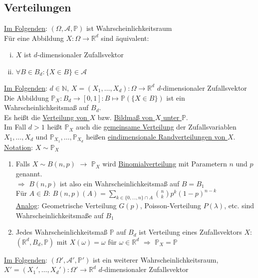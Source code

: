 \documentclass[a4paper]{article}
\newcommand{\ul}{\underline}
\begin{document}
\subsection{Verteilungen}
\ul{Im Folgenden}: $(\Omega,\mathcal{A},\mathbb{P})$ ist Wahrscheinlichkeitsraum\\
Für eine Abbildung $X:\Omega\rightarrow\mathbb{R}^d$ sind äquivalent:
\begin{enumerate}[(i)]
	\item $X$ ist $d$-dimensionaler Zufallsvektor
	\item $\forall B\in B_d:\{X\in B\}\in \mathcal{A}$
\end{enumerate}
\ul{Im Folgenden}: $d\in\mathbb{N}$, $X=(X_1,\dots,X_d):\Omega\rightarrow\mathbb{R}^d$ $d$-dimensionaler Zufallsvektor\\
Die Abbildung $\mathbb{P}_X:B_d\rightarrow\left[0,1\right]:B\mapsto\mathbb{P}(\{X\in B\})$ ist ein Wahrscheinlichkeitsmaß auf $B_d$.\\
Es heißt die \ul{Verteilung von $X$} bzw. \ul{Bildmaß von $X$ unter $\mathbb{P}$}.\\
Im Fall $d>1$ heißt $\mathbb{P}_X$ auch die \ul{gemeinsame Verteilung} der Zufallsvariablen $X_1,\dots,X_d$ und $\mathbb{P}_{X_1},\dots,\mathbb{P}_{X_d}$ heißen \ul{eindimensionale Randverteilungen von $X$}.\\
\ul{Notation}: $X\sim\mathbb{P}_X$\\
\begin{enumerate}[1)]
	\item Falls $X\sim B(n,p)$ $\rightarrow$ $\mathbb{P}_X$ wird \ul{Binomialverteilung} mit Parametern $n$ und $p$ genannt.\\
	$\Rightarrow$ $B(n,p)$ ist also ein Wahrscheinlichkeitsmaß auf $B=B_1$\\
	Für $A\in B$: $B(n,p)(A)=\sum_{k\in\{0,\dots,n\}\cap A}\binom{n}{k}p^k(1-p)^{n-k}$\\
	\ul{Analog}: Geometrische Verteilung $G(p)$, Poisson-Verteilung $P(\lambda)$, etc. sind Wahrscheinlichkeitsmaße auf $B_1$
	\item Jedes Wahrscheinlichkeitsmaß $\mathbb{P}$ auf $B_d$ ist Verteilung eines Zufallsvektors $X$: $(\mathbb{R}^d,B_d,\mathbb{P})$ mit $X(\omega)=\omega$ für $\omega\in\mathbb{R}^d$ $\Rightarrow$ $\mathbb{P}_X=\mathbb{P}$
\end{enumerate}
\ul{Im Folgenden}: $(\Omega',\mathcal{A}',\mathbb{P}')$ ist ein weiterer Wahrscheinlichkeitsraum, $X'=(X_1',\dots,X_d'):\Omega'\rightarrow\mathbb{R}^d$ $d$-dimensionaler Zufallsvektor\\
\end{document}
